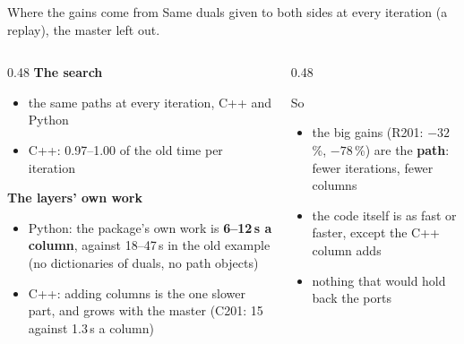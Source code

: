 \documentclass[aspectratio=169]{beamer}
\begin{document}
\begin{frame}{Where the gains come from}
  Same duals given to both sides at every iteration (a replay), the master left out.

  \vspace{0.4em}
  \begin{columns}[T]
    \begin{column}{0.48\textwidth}
      \textbf{The search}
      \begin{itemize}\small
        \item the same paths at every iteration, C++ and Python
        \item C++: 0.97--1.00 of the old time per iteration
      \end{itemize}

      \vspace{0.3em}
      \textbf{The layers' own work}
      \begin{itemize}\small
        \item Python: the package's own work is \textbf{6--12\,\textmu s a column}, against 18--47\,\textmu s in
          the old example (no dictionaries of duals, no path objects)
        \item C++: adding columns is the one slower part, and grows with the master (C201: 15 against 1.3\,\textmu s
          a column)
      \end{itemize}
    \end{column}
    \begin{column}{0.48\textwidth}
      \begin{block}{So}
        \small
        \begin{itemize}
          \item the big gains (R201: $-32$\,\%, $-78$\,\%) are the \textbf{path}: fewer iterations, fewer columns
          \item the code itself is as fast or faster, except the C++ column adds
          \item nothing that would hold back the ports
        \end{itemize}
      \end{block}
    \end{column}
  \end{columns}
\end{frame}
\end{document}

